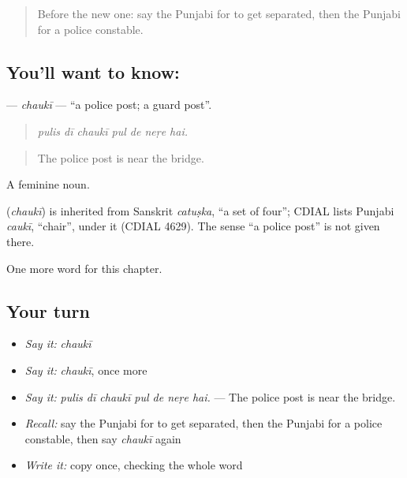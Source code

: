 \label{lesson:PA-C272-chauki}



\begin{quote}
Before the new one: say the Punjabi for to get separated, then the Punjabi for a police constable.
\end{quote}

\subsection*{You'll want to know: }
\textbf{} — \emph{chaukī} — \textquotedblleft{}a police post; a guard post\textquotedblright{}.

\begin{quote}
      
\end{quote}

\begin{quote}
\emph{pulis dī chaukī pul de neṛe hai.}
\end{quote}

\begin{quote}
The police post is near the bridge.
\end{quote}

A feminine noun.

\begin{cousinweb}
\textbf{} (\emph{chaukī}) is inherited from Sanskrit \emph{catuṣka}, \textquotedblleft{}a set of four\textquotedblright{}; CDIAL lists Punjabi \emph{caukī}, \textquotedblleft{}chair\textquotedblright{}, under it (CDIAL 4629). The sense \textquotedblleft{}a police post\textquotedblright{} is not given there.
\end{cousinweb}

\begin{grammarlens}[title={What you've built}]
One more word for this chapter.
\end{grammarlens}

\subsection*{Your turn}
\begin{itemize}
\raggedright
  \item \emph{Say it:} \emph{chaukī}
  \item \emph{Say it:} \emph{chaukī}, once more
  \item \emph{Say it:} \emph{pulis dī chaukī pul de neṛe hai.} — The police post is near the bridge.
  \item \emph{Recall:} say the Punjabi for to get separated, then the Punjabi for a police constable, then say \emph{chaukī} again
  \item \emph{Write it:} copy \textbf{} once, checking the whole word
\end{itemize}


